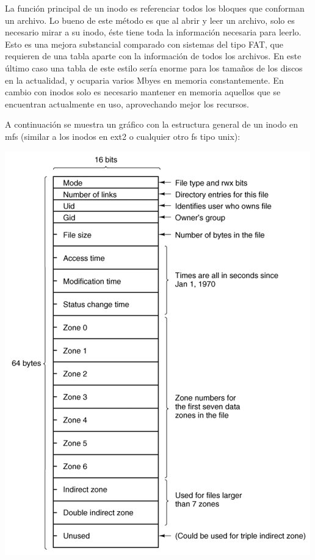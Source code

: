 La función principal de un inodo es referenciar todos los bloques que conforman
un archivo. Lo bueno de este método es que al abrir y leer un archivo, solo es
necesario mirar a su inodo, éste tiene toda la información necesaria para
leerlo. Esto es una mejora substancial comparado con sistemas del tipo FAT, que
requieren de una tabla aparte con la información de todos los archivos. En este
último caso una tabla de este estilo sería enorme para los tamaños de los discos
en la actualidad, y ocuparia varios Mbyes en memoria constantemente. En cambio
con inodos solo es necesario mantener en memoria aquellos que se encuentran
actualmente en uso, aprovechando mejor los recursos.

A continuación se muestra un gráfico con la estructura general de un inodo en
mfs (similar a los inodos en ext2 o cualquier otro fs tipo unix):

\begin{center}
\includegraphics[scale=0.5]{../img/inode.png}
\end{center}


